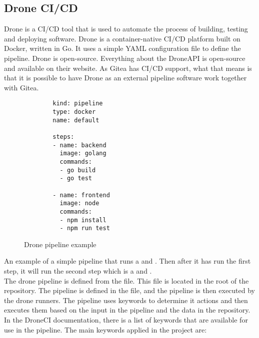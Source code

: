 \subsection{Drone CI/CD}
\label{sec:drone}
Drone\cite{droneio} is a \ac{CI/CD} tool that is used to automate the process of building, testing and deploying software.
Drone is a container-native \ac{CI/CD} platform built on Docker, written in Go. It uses a simple \ac{YAML} configuration file
to define the pipeline. 
Drone is open-source. Everything about the DroneAPI is open-source and 
available on their website.
As Gitea has CI/CD support, what that means is that 
it is possible to have Drone as an external pipeline software work together with Gitea.
\begin{figure}
    \begin{verbatim}
        kind: pipeline
        type: docker
        name: default
            
        steps:
        - name: backend
          image: golang
          commands:
          - go build
          - go test
            
        - name: frontend
          image: node
          commands:
          - npm install
          - npm run test
      \end{verbatim}
      \caption{Drone pipeline example}
      \label{fig:drone_pipeline}
\end{figure}
An example of a simple 
pipeline that runs a  and . Then after it has run the first step, 
it will run the second step which is a  and .\\
The drone pipeline is defined from the  file. 
This file is located in the root of the repository.
The pipeline is defined in the file, and the pipeline is then executed by the drone runners.
The pipeline uses keywords to determine it actions and then executes them based on 
the input in the pipeline and the data in the repository.
In the DroneCI documentation\cite{droneio}, there is a list of 
keywords that are available for use in the pipeline. The main keywords applied in the project are\cite{droneio}:


